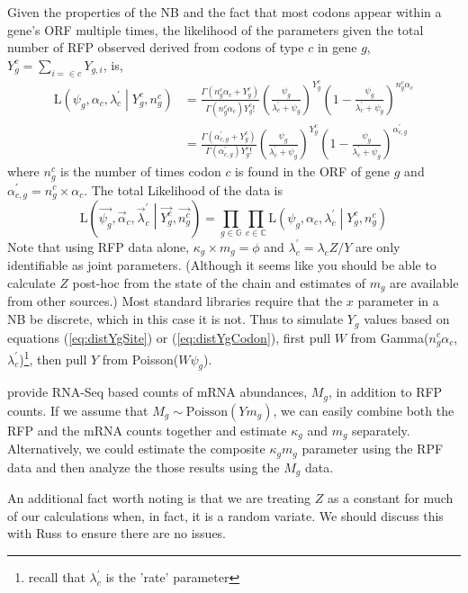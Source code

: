 \documentclass{article}
\newcommand{\alphac}{\ensuremath{{\alpha_c}}\xspace}
\newcommand{\alphacgprime}{\ensuremath{{\alpha_{c,g}^\prime}}\xspace}
\newcommand{\alphacvec}{\ensuremath{{\vec{\alpha}_c}}\xspace}
\newcommand{\lambdac}{\ensuremath{{\lambda_c}}\xspace}
\newcommand{\lambdacprime}{\ensuremath{{\lambda_c^\prime}}\xspace}
\newcommand{\lambdacprimevec}{\ensuremath{{\vec{\lambda}_c^\prime}}\xspace}
\newcommand{\ngc}{\ensuremath{{n_{g}^c}}\xspace}
\newcommand{\mg}{\ensuremath{{m_g}}\xspace}
\newcommand{\Mg}{\ensuremath{{M_g}}\xspace}
\newcommand{\psig}{\ensuremath{{\psi_g}}\xspace}
\newcommand{\kappag}{\ensuremath{{\kappa_{g}}}\xspace}
\newcommand{\Ztheta}{\ensuremath{{Z}}\xspace}
\newcommand{\Yg}{\ensuremath{{Y_{g}}}\xspace}
\newcommand{\Ytotal}{\ensuremath{{Y}}\xspace}
\newcommand{\Ygi}{\ensuremath{{Y_{g,i}}}\xspace}
\newcommand{\Ygc}{\ensuremath{{Y_{g}^c}}\xspace}
\newcommand{\Lik}{\ensuremath{\text{L}}\xspace}
\newcommand{\setG}{\ensuremath{\mathbb{G}}\xspace}
\newcommand{\setC}{\ensuremath{\mathbb{C}}\xspace}
\newcommand{\Ygcvec}{\ensuremath{{\Vec{\Ygc}}}\xspace}
\newcommand{\ngcvec}{\ensuremath{{\Vec{\ngc}}}\xspace}
\newcommand{\psigvec}{\ensuremath{{\Vec{\psig}}}\xspace}
\begin{document}
Given the properties of the NB \citep[p.~141]{ForbesEtAl11} and the fact that most codons appear within a gene's ORF multiple times, the likelihood of the parameters given the total number of RFP observed derived from codons of type $c$ in gene $g$, $\Ygc = \sum_{i=\in c} \Ygi$, is,
\begin{align}
  \Lik\left(\psig, \alphac, \lambdacprime \middle| \Ygc, \ngc\right) &= \frac{\Gamma\left(\ngc \alphac + \Ygc\right)}{\Gamma\left(\ngc \alphac\right) \Ygc!} 
  \left(\frac{\psig}{\lambdacprime + \psig}\right)^\Ygc \left(1-\frac{\psig}{\lambdacprime + \psig}\right)^{\ngc \alphac}\\
\label{eq:distYgCodon}&= \frac{\Gamma\left(\alphacgprime + \Ygc\right)}{\Gamma\left(\alphacgprime\right) \Ygc!} 
  \left(\frac{\psig}{\lambdacprime + \psig}\right)^\Ygc \left(1-\frac{\psig}{\lambdacprime + \psig}\right)^{\alphacgprime}
\end{align}
where $\ngc$ is the number of times codon $c$ is found in the ORF of gene $g$ and $\alphacgprime = \ngc \times \alphac$.
The total Likelihood of the data is
\begin{equation}
  \Lik\left(\psigvec, \alphacvec, \lambdacprimevec \middle| \Ygcvec, \ngcvec\right) = \prod_{g \in \setG} \prod_{c \in \setC}  \Lik\left(\psig, \alphac, \lambdacprime \middle| \Ygc, \ngc\right)
\end{equation}
Note that using RFP data alone, $\kappag \times \mg = \phi$ and $\lambdacprime = \lambdac \Ztheta/\Ytotal$ are only identifiable as joint parameters. 
(Although it seems like you should be able to calculate \Ztheta post-hoc from the state of the chain and estimates of \mg are available from other sources.)
Most standard libraries require that the $x$ parameter in a NB be discrete, which in this case it is not.
Thus to simulate \Yg values based on equations (\ref{eq:distYgSite}) or (\ref{eq:distYgCodon}), first pull $W$ from Gamma(\ngc \alphac, \lambdacprime)\footnote{recall that \lambdacprime is the 'rate' parameter}, then pull $Y$ from Poisson($W \psig$).
  
\citet{PopEtAl14} provide RNA-Seq based counts of mRNA abundances, \Mg, in addition to RFP counts.
If we assume that $\Mg \sim \text{Poisson}(\Ytotal \mg)$, we can easily combine both the RFP and the mRNA counts together and estimate $\kappag$ and $\mg$ separately.
Alternatively, we could estimate the composite \kappag \mg parameter using the RPF data and then analyze the those results using the \Mg data.

An additional fact worth noting is that we are treating $Z$ as a constant for much of our calculations when, in fact, it is a random variate.
We should discuss this with Russ to ensure there are no issues.
\end{document}
